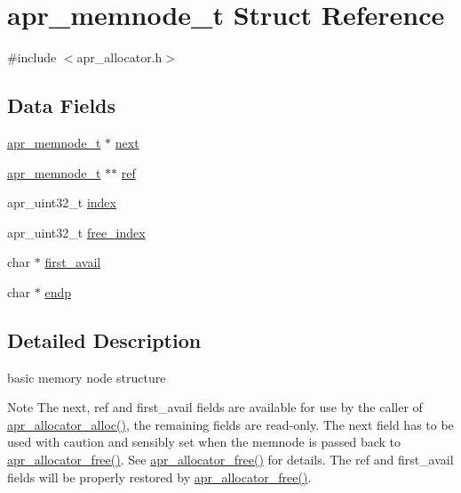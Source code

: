 \hypertarget{structapr__memnode__t}{\section{apr\-\_\-memnode\-\_\-t Struct Reference}
\label{structapr__memnode__t}
}


{\ttfamily \#include $<$apr\-\_\-allocator.\-h$>$}

\subsection*{Data Fields}
\begin{DoxyCompactItemize}
\item 
\hyperlink{structapr__memnode__t}{apr\-\_\-memnode\-\_\-t} $\ast$ \hyperlink{structapr__memnode__t_a07dd84ca152164d6bc283dbce99f8f78}{next}
\item 
\hyperlink{structapr__memnode__t}{apr\-\_\-memnode\-\_\-t} $\ast$$\ast$ \hyperlink{structapr__memnode__t_ac68a939c0c3d48498ec0c0fde409c502}{ref}
\item 
apr\-\_\-uint32\-\_\-t \hyperlink{structapr__memnode__t_a6188325f9e1cbcafcb0a65b7e41881a1}{index}
\item 
apr\-\_\-uint32\-\_\-t \hyperlink{structapr__memnode__t_af63769f30f6eb9d72e4b24050bd7a9d9}{free\-\_\-index}
\item 
char $\ast$ \hyperlink{structapr__memnode__t_a863e7980225e46678881271c4c803e4c}{first\-\_\-avail}
\item 
char $\ast$ \hyperlink{structapr__memnode__t_a35c9bf71f1cc680929f857176b547a05}{endp}
\end{DoxyCompactItemize}


\subsection{Detailed Description}
basic memory node structure \begin{DoxyNote}{Note}
The next, ref and first\-\_\-avail fields are available for use by the caller of \hyperlink{group__apr__allocator_ga7452b0837c2148bd63109f89bbc0c3db}{apr\-\_\-allocator\-\_\-alloc()}, the remaining fields are read-\/only. The next field has to be used with caution and sensibly set when the memnode is passed back to \hyperlink{group__apr__allocator_ga124e48339838213fd5e160a4125cb7e8}{apr\-\_\-allocator\-\_\-free()}. See \hyperlink{group__apr__allocator_ga124e48339838213fd5e160a4125cb7e8}{apr\-\_\-allocator\-\_\-free()} for details. The ref and first\-\_\-avail fields will be properly restored by \hyperlink{group__apr__allocator_ga124e48339838213fd5e160a4125cb7e8}{apr\-\_\-allocator\-\_\-free()}. 
\end{DoxyNote}


